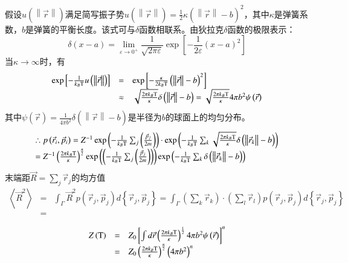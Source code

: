 \documentclass{article} %
\begin{document}
假设$u\left(\left\| \vec{r}\right\| \right)$满足简写振子势$u\left(\left\| \vec{r}\right\| \right)=\frac{1}{2} \kappa \left(\left\| \vec{r}\right\| -b\right)^{2} $，其中$\kappa $是弹簧系数，$b$是弹簧的平衡长度。该式可与$\delta $函数相联系。由狄拉克$\delta $函数的极限表示：
\[\delta \left(x-a\right)={\mathop{\lim }\limits_{\varepsilon \to 0^{+} }} \frac{1}{\sqrt{2\pi \varepsilon } } \exp \left[-\frac{1}{2\varepsilon } \left(x-a\right)^{2} \right]\] 
当$\kappa \to \infty $时，有
\[\begin{array}{rcl} {\exp \left[-\frac{1}{k_{B} {\rm T} } u\left(\left\| \vec{r}\right\| \right)\right]} & {=} & {\exp \left[-\frac{\kappa }{2k_{B} {\rm T} } \left(\left\| \vec{r}\right\| -b\right)^{2} \right]} \\ {} & {\approx } & {\sqrt{\frac{2\pi k_{B} {\rm T} }{\kappa } } \delta \left(\left\| \vec{r}\right\| -b\right)=\sqrt{\frac{2\pi k_{B} {\rm T} }{\kappa } } 4\pi b^{2} \psi \left(\vec{r}\right)} \end{array}\] 
其中$\psi \left(\vec{r}\right)=\frac{1}{4\pi b^{2} } \delta \left(\left\| \vec{r}\right\| -b\right)$是半径为$b$的球面上的均匀分布。
\[\begin{array}{l} {\therefore p\left(\vec{r}_{i} ,\vec{p}_{i} \right)=Z^{-1} \exp \left(-\frac{1}{k_{B} {\rm T} } \sum _{j}\left(\frac{\vec{p}_{j} }{2m} \right) \right)\cdot \exp \left(-\frac{1}{k_{B} {\rm T} } \sum _{k}\sqrt{\frac{2\pi k_{B} {\rm T} }{\kappa } } \delta \left(\left\| \vec{r}_{k} \right\| -b\right) \right)} \\ {=Z^{-1} \left(\frac{2\pi k_{B} {\rm T} }{\kappa } \right)^{\frac{n}{2} } \exp \left(\left(-\frac{1}{k_{B} {\rm T} } \sum _{j}\left(\frac{\vec{p}_{j} }{2m} \right) \right)\right)\exp \left(-\frac{1}{k_{B} {\rm T} } \sum _{k}\delta \left(\left\| \vec{r}_{k} \right\| -b\right) \right)} \end{array}\] 
末端距$\vec{R}=\sum _{j}\vec{r}_{j}  $的均方值
\[\begin{array}{rcl} {\left\langle \vec{R}^{2} \right\rangle } & {=} & {\int _{\Gamma }\vec{R}^{2} p\left(\vec{r}_{j} ,\vec{p}_{j} \right) d\left\{\vec{r}_{j} ,\vec{p}_{j} \right\}=\int _{\Gamma }\left(\sum _{k}\vec{r}_{k}  \right) \cdot \left(\sum _{l}\vec{r}_{l}  \right)p\left(\vec{r}_{j} ,\vec{p}_{j} \right)d\left\{\vec{r}_{j} ,\vec{p}_{j} \right\}} \\ {} & {=} & {} \end{array}\] 

\[\begin{array}{rcl} {Z\left({\rm T} \right)} & {=} & {Z_{0} \left[\int d\vec{r} \left(\frac{2\pi k_{B} {\rm T} }{\kappa } \right)^{\frac{1}{2} } 4\pi b^{2} \psi \left(\vec{r}\right)\right]^{n} } \\ {} & {=} & {Z_{0} \left(\frac{2\pi k_{B} {\rm T} }{\kappa } \right)^{\frac{n}{2} } \left(4\pi b^{2} \right)^{n} } \end{array}\] 


\noindent 

\noindent 
\end{document}
